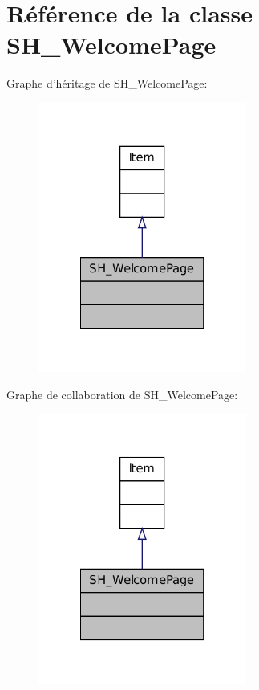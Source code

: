 \hypertarget{classSH__WelcomePage}{\section{Référence de la classe S\-H\-\_\-\-Welcome\-Page}
\label{classSH__WelcomePage}
}


Graphe d'héritage de S\-H\-\_\-\-Welcome\-Page\-:
\nopagebreak
\begin{figure}[H]
\begin{center}
\leavevmode
\includegraphics[width=194pt]{classSH__WelcomePage__inherit__graph}
\end{center}
\end{figure}


Graphe de collaboration de S\-H\-\_\-\-Welcome\-Page\-:
\nopagebreak
\begin{figure}[H]
\begin{center}
\leavevmode
\includegraphics[width=194pt]{classSH__WelcomePage__coll__graph}
\end{center}
\end{figure}
